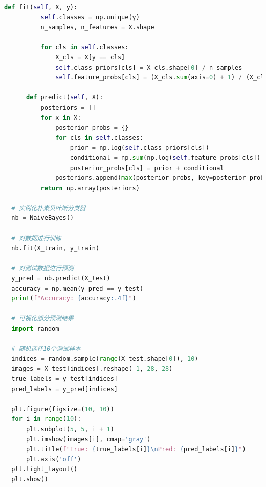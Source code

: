 \documentclass[12pt]{article}
\begin{document}
\begin{lstlisting}[language=Python]
      def fit(self, X, y):
          self.classes = np.unique(y)
          n_samples, n_features = X.shape
  
          for cls in self.classes:
              X_cls = X[y == cls]
              self.class_priors[cls] = X_cls.shape[0] / n_samples
              self.feature_probs[cls] = (X_cls.sum(axis=0) + 1) / (X_cls.shape[0] + 2)
  
      def predict(self, X):
          posteriors = []
          for x in X:
              posterior_probs = {}
              for cls in self.classes:
                  prior = np.log(self.class_priors[cls])
                  conditional = np.sum(np.log(self.feature_probs[cls]) * x + np.log(1 - self.feature_probs[cls]) * (1 - x))
                  posterior_probs[cls] = prior + conditional
              posteriors.append(max(posterior_probs, key=posterior_probs.get))
          return np.array(posteriors)
  
  # 实例化朴素贝叶斯分类器
  nb = NaiveBayes()
  
  # 对数据进行训练
  nb.fit(X_train, y_train)
  
  # 对测试数据进行预测
  y_pred = nb.predict(X_test)
  accuracy = np.mean(y_pred == y_test)
  print(f"Accuracy: {accuracy:.4f}")
  
  # 可视化部分预测结果
  import random
  
  # 随机选择10个测试样本
  indices = random.sample(range(X_test.shape[0]), 10)
  images = X_test[indices].reshape(-1, 28, 28)
  true_labels = y_test[indices]
  pred_labels = y_pred[indices]
  
  plt.figure(figsize=(10, 10))
  for i in range(10):
      plt.subplot(5, 5, i + 1)
      plt.imshow(images[i], cmap='gray')
      plt.title(f"True: {true_labels[i]}\nPred: {pred_labels[i]}")
      plt.axis('off')
  plt.tight_layout()
  plt.show()
  
\end{lstlisting}
\end{document}
